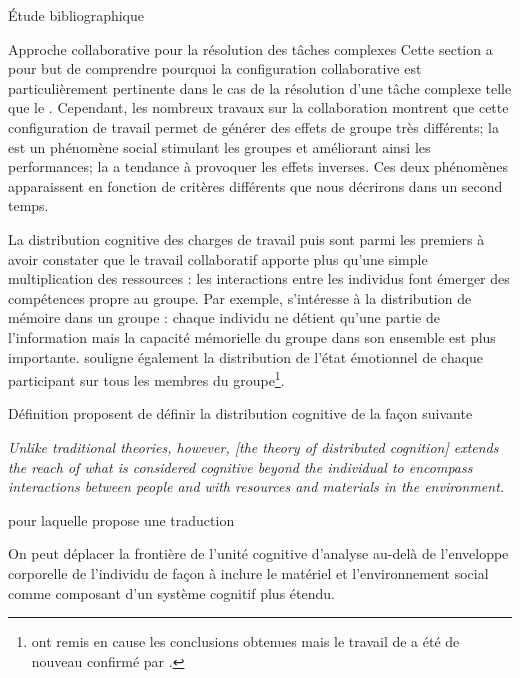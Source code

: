 \documentclass[myfrancais,ngerman,english,french]{mythesis}
\begin{document}
\begin{mychapter}{Étude bibliographique}
\begin{mysection}{Approche collaborative pour la résolution des tâches complexes}
			Cette section a pour but de comprendre pourquoi la configuration collaborative est particulièrement pertinente dans le cas de la résolution d'une tâche complexe telle que le .
			Cependant, les nombreux travaux sur la collaboration montrent que cette configuration de travail permet de générer des effets de groupe très différents; la  est un phénomène social stimulant les groupes et améliorant ainsi les performances; la  a tendance à provoquer les effets inverses.
			Ces deux phénomènes apparaissent en fonction de critères différents que nous décrirons dans un second temps.
			\begin{mysubsection}{La distribution cognitive des charges de travail}
				 puis  sont parmi les premiers à avoir constater que le travail collaboratif apporte plus qu'une simple multiplication des ressources : les interactions entre les individus font émerger des compétences propre au groupe.
				Par exemple,  s'intéresse à la distribution de mémoire dans un groupe : chaque individu ne détient qu'une partie de l'information mais la capacité mémorielle du groupe dans son ensemble est plus importante.
				 souligne également la distribution de l'état émotionnel de chaque participant sur tous les membres du groupe\footnote{ ont remis en cause les conclusions obtenues mais le travail de  a été de nouveau confirmé par .}.
				\begin{mysubsubsection}{Définition}
					 proposent de définir la distribution cognitive de la façon suivante
					\begin{myquote}[english]
						\it Unlike traditional theories, however, [the theory of distributed cognition] extends the reach of what is considered cognitive beyond the individual to encompass interactions between people and with resources and materials in the environment.
					\end{myquote}
					pour laquelle  propose une traduction
					\begin{myquote}[french]
						On peut déplacer la frontière de l'unité cognitive d'analyse au-delà de l'enveloppe corporelle de l'individu de façon à inclure le matériel et l'environnement social comme composant d'un système cognitif plus étendu.
					\end{myquote}


\end{mysubsubsection}
\end{mysubsection}
\end{mysection}
\end{mychapter}
\end{document}
